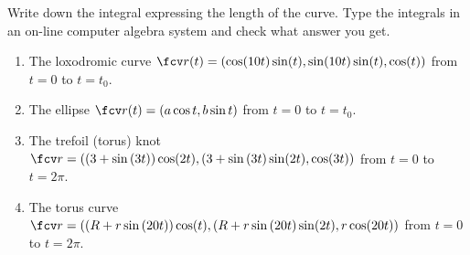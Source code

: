 Write down the integral expressing the length of the curve. Type the integrals in an on-line computer algebra system and check what answer you get.

\begin{enumerate}
\item The loxodromic curve $\fcv r(t)= ( \cos (10t) \sin (t), \sin (10t)\sin (t), \cos (t) )$ from $t=0$ to $t=t_0$.
\item The ellipse $\fcv r(t) = ( a\cos t, b\sin t ) $ from $t=0$ to $t=t_0$.
\item The trefoil (torus) knot
$\fcv r=( \left( 3+\sin \left(3t\right)\right) \cos (2t) ,(3+\sin \left( 3t \right) \sin (2t) ,\cos (3t))
$
from $t=0$ to $t=2\pi$.
\item The torus curve
$\fcv r=( \left( R+r\sin \left(20t\right)\right) \cos (t) ,(R+r\sin \left( 20t \right) \sin (2t) ,r\cos (20t))
$
from $t=0$ to $t=2\pi$.
\end{enumerate}
